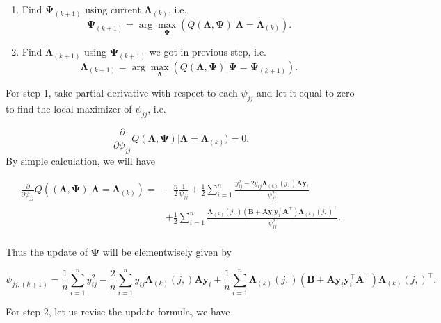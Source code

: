 \documentclass[
  a4paper,
  oneside,
  openany,
  12pt,
  onecolumn]{book}
\providecommand{\tightlist}{%
  \setlength{\itemsep}{0pt}\setlength{\parskip}{0pt}}\usepackage{longtable,booktabs,array}
\theoremstyle{plain}
\theoremstyle{remark}
\begin{document}
\begin{enumerate}
\def\labelenumi{\arabic{enumi}.}
\tightlist
\item
  Find \(\boldsymbol{\Psi}_{(k+1)}\) using current
  \(\boldsymbol{\Lambda}_{(k)}\), i.e. \[
    \boldsymbol{\Psi}_{(k+1)} = \arg \max_{\boldsymbol{\Psi}} (Q(\boldsymbol{\Lambda},\boldsymbol{\Psi})|\boldsymbol{\Lambda}=\boldsymbol{\Lambda}_{(k)}).
  \]
\item
  Find \(\boldsymbol{\Lambda}_{(k+1)}\) using
  \(\boldsymbol{\Psi}_{(k+1)}\) we got in previous step, i.e.~ \[
    \boldsymbol{\Lambda}_{(k+1)} = \arg \max_{\boldsymbol{\Lambda}} (Q(\boldsymbol{\Lambda},\boldsymbol{\Psi})|\boldsymbol{\Psi}=\boldsymbol{\Psi}_{(k+1)}).
  \]
\end{enumerate}

For step 1, take partial derivative with respect to each \(\psi_{jj}\)
and let it equal to zero to find the local maximizer of \(\psi_{jj}\),
i.e.~

\[
\frac{\partial}{\partial \psi_{jj}}Q(\boldsymbol{\Lambda},\boldsymbol{\Psi})|\boldsymbol{\Lambda}=\boldsymbol{\Lambda}_{(k)})=0.
\] By simple calculation, we will have

\[
\begin{align*}
\frac{\partial}{\partial \psi_{jj}}Q((\boldsymbol{\Lambda},\boldsymbol{\Psi})|\boldsymbol{\Lambda}=\boldsymbol{\Lambda}_{(k)})=
&-\frac{n}{2}\frac{1}{\psi_{jj}}+\frac{1}{2}\sum_{i=1}^n
\frac{y_{ij}^2-2y_{ij}\boldsymbol{\Lambda}_{(k)}(j,)\boldsymbol{A}\boldsymbol{y}_i}{\psi_{jj}^2} \\
&+ \frac{1}{2}\sum_{i=1}^n\frac{\boldsymbol{\Lambda}_{(k)}(j,)(\boldsymbol{B}+\boldsymbol{A}\boldsymbol{y}_i\boldsymbol{y}_i^\top\boldsymbol{A}^\top)\boldsymbol{\Lambda}_{(k)}(j,)^\top}{\psi_{jj}^2}.\\
\end{align*}
\]

Thus the update of \(\boldsymbol{\Psi}\) will be elementwisely given by

\[
\begin{equation}
\psi_{jj,(k+1)}=\frac{1}{n}\sum_{i=1}^n y_{ij}^2-\frac{2}{n}\sum_{i=1}^ny_{ij}\boldsymbol{\Lambda}_{(k)}(j,)\boldsymbol{A}\boldsymbol{y}_i + \frac{1}{n}\sum_{i=1}^n \boldsymbol{\Lambda}_{(k)}(j,)(\boldsymbol{B}+\boldsymbol{A}\boldsymbol{y}_i\boldsymbol{y}_i^\top\boldsymbol{A}^\top)\boldsymbol{\Lambda}_{(k)}(j,)^\top.
\end{equation}
\]

For step 2, let us revise the update formula, we have
\end{document}
